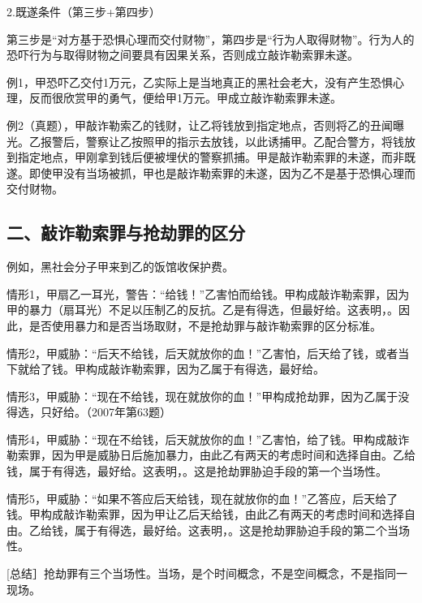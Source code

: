 2.既遂条件（第三步+第四步）

第三步是“对方基于恐惧心理而交付财物”，第四步是“行为人取得财物”。行为人的恐吓行为与取得财物之间要具有因果关系，否则成立敲诈勒索罪未遂。

例1，甲恐吓乙交付1万元，乙实际上是当地真正的黑社会老大，没有产生恐惧心理，反而很欣赏甲的勇气，便给甲1万元。甲成立敲诈勒索罪未遂。

例2（真题），甲敲诈勒索乙的钱财，让乙将钱放到指定地点，否则将乙的丑闻曝光。乙报警后，警察让乙按照甲的指示去放钱，以此诱捕甲。乙配合警方，将钱放到指定地点，甲刚拿到钱后便被埋伏的警察抓捕。甲是敲诈勒索罪的未遂，而非既遂。即使甲没有当场被抓，甲也是敲诈勒索罪的未遂，因为乙不是基于恐惧心理而交付财物。

\subsection*{二、敲诈勒索罪与抢劫罪的区分}


例如，黑社会分子甲来到乙的饭馆收保护费。

情形1，甲扇乙一耳光，警告：“给钱！”乙害怕而给钱。甲构成敲诈勒索罪，因为甲的暴力（扇耳光）不足以压制乙的反抗。乙是有得选，但最好给。这表明，。因此，是否使用暴力和是否当场取财，不是抢劫罪与敲诈勒索罪的区分标准。

情形2，甲威胁：“后天不给钱，后天就放你的血！”乙害怕，后天给了钱，或者当下就给了钱。甲构成敲诈勒索罪，因为乙属于有得选，最好给。

情形3，甲威胁：“现在不给钱，现在就放你的血！”甲构成抢劫罪，因为乙属于没得选，只好给。（2007年第63题）

情形4，甲威胁：“现在不给钱，后天就放你的血！”乙害怕，给了钱。甲构成敲诈勒索罪，因为甲是威胁日后施加暴力，由此乙有两天的考虑时间和选择自由。乙给钱，属于有得选，最好给。这表明，。这是抢劫罪胁迫手段的第一个当场性。

情形5，甲威胁：“如果不答应后天给钱，现在就放你的血！”乙答应，后天给了钱。甲构成敲诈勒索罪，因为甲让乙后天给钱，由此乙有两天的考虑时间和选择自由。乙给钱，属于有得选，最好给。这表明，。这是抢劫罪胁迫手段的第二个当场性。

[总结］抢劫罪有三个当场性。当场，是个时间概念，不是空间概念，不是指同一现场。

